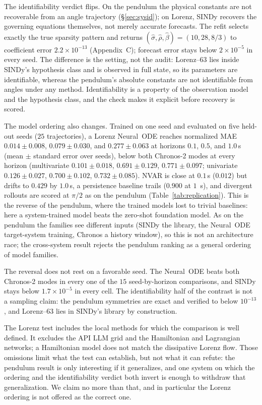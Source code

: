 \documentclass{article}
\begin{document}
The identifiability verdict flips. On the pendulum the physical constants are not recoverable
from an angle trajectory (\S\ref{sec:sysid}); on Lorenz, SINDy recovers the governing
equations themselves, not merely accurate forecasts. The refit selects exactly the true sparsity
pattern and returns $(\hat\sigma,\hat\rho,\hat\beta)=(10,28,8/3)$ to coefficient error
$2.2\times10^{-13}$ (Appendix~C); forecast error stays below $2\times10^{-5}$ in every seed.
The difference is the setting, not the audit: Lorenz--63 lies inside SINDy's hypothesis class
and is observed in full state, so its parameters are identifiable, whereas the pendulum's
absolute constants are not identifiable from angles under any method. Identifiability is a
property of the observation model and the hypothesis class, and the check makes it explicit
before recovery is scored.

The model ordering also changes. Trained on one seed and evaluated on five held-out seeds
($25$ trajectories), a Lorenz Neural~ODE reaches normalized MAE $0.014\pm0.008$, $0.079\pm0.030$,
and $0.277\pm0.063$ at horizons $0.1$, $0.5$, and $1.0$\,s (mean $\pm$ standard error over
seeds), below both Chronos-2 modes at every horizon (multivariate $0.101\pm0.018$,
$0.691\pm0.129$, $0.771\pm0.097$; univariate $0.126\pm0.027$, $0.700\pm0.102$,
$0.732\pm0.085$). NVAR is close at $0.1$\,s ($0.012$) but drifts to $0.429$ by $1.0$\,s, a
persistence baseline trails ($0.900$ at $1$~s), and divergent rollouts are scored at $\pi/2$ as
on the pendulum (Table~\ref{tab:replication}). This is the reverse of the pendulum, where the
trained models lost to trivial baselines: here a system-trained model beats the zero-shot
foundation model. As on the pendulum the families see different inputs (SINDy the library, the
Neural~ODE target-system training, Chronos a history window), so this is not an architecture
race; the cross-system result rejects the pendulum ranking as a general ordering of model
families.

The reversal does not rest on a favorable seed. The Neural~ODE beats both Chronos-2 modes in
every one of the $15$ seed-by-horizon comparisons, and SINDy stays below $1.7\times10^{-5}$
in every cell. The identifiability half of the contrast is not a sampling claim: the
pendulum symmetries are exact and verified to below $10^{-13}$, and Lorenz--63 lies in
SINDy's library by construction.

The Lorenz test includes the local methods for which the comparison is well defined. It excludes
the API LLM grid and the Hamiltonian and Lagrangian networks; a Hamiltonian model does not match
the dissipative Lorenz flow. Those omissions limit what the test can establish, but not what it
can refute: the pendulum result is only interesting if it generalizes, and one system on which
the ordering and the identifiability verdict both invert is enough to withdraw that
generalization. We claim no more than that, and in particular the Lorenz ordering is not offered
as the correct one.
\end{document}
